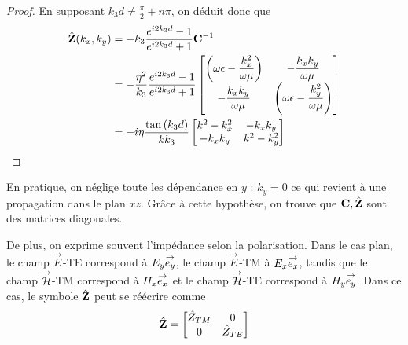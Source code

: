 \begin{proof}
            En supposant \(k_3d \not = \frac{\pi}{2} + n\pi\), on déduit donc que
            \begin{align}
                \hat {\mathbf{Z}}(k_x,k_y) &=  - k_3 \dfrac{e^{i2k_3d} -1}{e^{i2k_3d} +1} \mathbf{C}^{-1}
                \\
                &= -\dfrac{\eta^2}{k_3} \dfrac{e^{i2k_3d} -1}{e^{i2k_3d} +1}
                    \begin{bmatrix}
                       \left(\omega\epsilon-\dfrac{k_x^2}{\omega\mu}\right)  & -\dfrac{k_xk_y}{\omega\mu}\\
                        -\dfrac{k_xk_y}{\omega\mu} &  \left(\omega\epsilon-\dfrac{k_y^2}{\omega\mu}\right)
                    \end{bmatrix}
                \\
                &= -i\eta\dfrac{\tan\left(k_3d\right)}{kk_3}
                    \begin{bmatrix}
                       k^2-k_x^2  & -k_xk_y\\
                        -k_xk_y & k^2-k_y^2\\
                    \end{bmatrix}
            \end{align}

        \end{proof}

        En pratique, on néglige toute les dépendance en \(y\) : \(k_y = 0\) ce qui revient à une propagation dans le plan \(xz\). Grâce à cette hypothèse, on trouve que \(\mathbf{C}, \hat {\mathbf{Z}}\) sont des matrices diagonales.

        De plus, on exprime souvent l'impédance selon la polarisation.
        Dans le cas plan, le champ \({\overset{\rightarrow}{E}}\)-TE correspond à \({E_y} {\overset{\rightarrow}{e_y}}\), le champ \({\overset{\rightarrow}{E}}\)-TM à \({E_x} {\overset{\rightarrow}{e_x}}\), tandis que le champ \({\overset{\rightarrow}{\mathcal{H}}}\)-TM correspond à \({H_x} {\overset{\rightarrow}{e_x}}\) et le champ \({\overset{\rightarrow}{\mathcal{H}}}\)-TE correspond à \({H_y} {\overset{\rightarrow}{e_y}}\).
        Dans ce cas, le symbole \(\hat {\mathbf{Z}}\) peut se réécrire comme
        \begin{equation}
            \hat {\mathbf{Z}} =
            \begin{bmatrix}
                \hat Z_{TM} & 0
                \\
                0 & \hat Z_{TE}
            \end{bmatrix}
        \end{equation}

